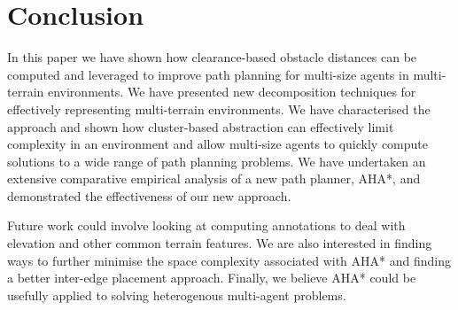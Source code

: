 \section{Conclusion}
In this paper we have shown how clearance-based obstacle distances can be computed and leveraged to improve path planning for multi-size agents in multi-terrain environments. 
We have presented new decomposition techniques for effectively representing multi-terrain environments.
We have characterised the approach and shown how cluster-based abstraction can effectively limit complexity in an environment and allow multi-size agents to quickly compute solutions to a wide range of path planning problems. 
We have undertaken an extensive comparative empirical analysis of a new path planner, AHA*, and demonstrated the effectiveness of our new approach. 
\par \indent
Future work could involve looking at computing annotations to deal with elevation and other common terrain features. We are also interested in finding ways to further minimise the space complexity associated with AHA* and finding a better inter-edge placement approach. Finally, we believe AHA* could be usefully applied to solving heterogenous multi-agent problems.
